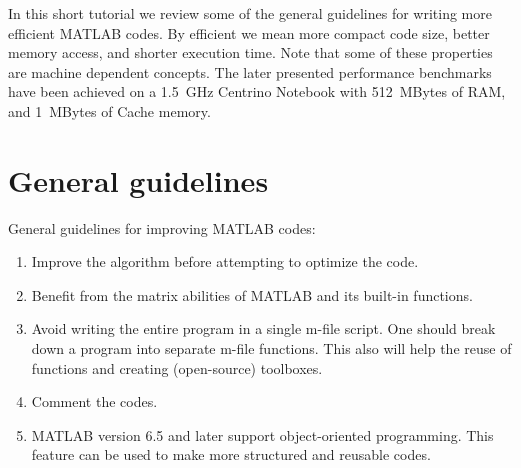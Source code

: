 \documentclass[10pt,a4paper]{article}
\begin{document}
In this short tutorial we review some of the general guidelines for writing more efficient MATLAB codes. By efficient we mean more compact code size, better memory access, and shorter execution time. Note that some of these properties are machine dependent concepts. The later presented performance benchmarks have been achieved on a 1.5~GHz Centrino Notebook with 512~MBytes of RAM, and 1~MBytes of Cache memory.
\section{General guidelines}
\label{sec:general}
General guidelines for improving MATLAB codes:
\begin{enumerate}
\item Improve the algorithm before attempting to optimize the code.
\item Benefit from the matrix abilities of MATLAB and its built-in functions.
\item Avoid writing the entire program in a single m-file script. One should break down a program into separate m-file functions. This also will help the reuse of functions and creating (open-source) toolboxes. 
\item Comment the codes.
\item MATLAB version 6.5 and later support object-oriented programming. This feature can be used to make more structured and reusable codes.
\end{enumerate}

\end{document}
